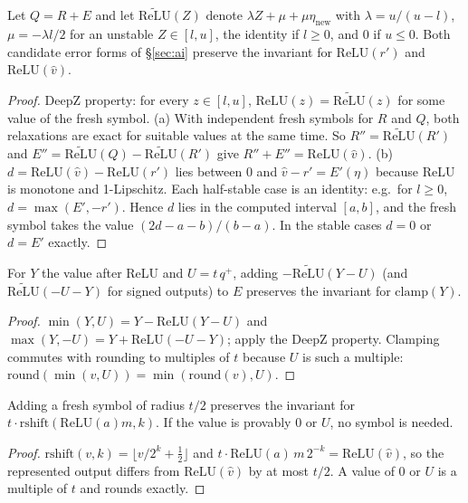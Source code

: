 \begin{lemma}[ReLU]
Let $Q=R+E$ and let $\widetilde{\mathrm{ReLU}}(Z)$ denote $\lambda Z+\mu+\mu\eta_{\mathrm{new}}$ with $\lambda=u/(u-l)$, $\mu=-\lambda l/2$ for an unstable $Z\in[l,u]$, the identity if $l\ge0$, and $0$ if $u\le0$. Both candidate error forms of \S\ref{sec:ai} preserve the invariant for $\mathrm{ReLU}(r')$ and $\mathrm{ReLU}(\hat v)$.
\end{lemma}
\begin{proof}
DeepZ property: for every $z\in[l,u]$, $\mathrm{ReLU}(z)=\widetilde{\mathrm{ReLU}}(z)$ for some value of the fresh symbol. (a) With independent fresh symbols for $R$ and $Q$, both relaxations are exact for suitable values at the same time. So $R''=\widetilde{\mathrm{ReLU}}(R')$ and $E''=\widetilde{\mathrm{ReLU}}(Q)-\widetilde{\mathrm{ReLU}}(R')$ give $R''+E''=\mathrm{ReLU}(\hat v)$. (b) $d=\mathrm{ReLU}(\hat v)-\mathrm{ReLU}(r')$ lies between $0$ and $\hat v-r'=E'(\eta)$ because ReLU is monotone and 1-Lipschitz. Each half-stable case is an identity: e.g.\ for $l\ge0$, $d=\max(E',-r')$. Hence $d$ lies in the computed interval $[a,b]$, and the fresh symbol takes the value $(2d-a-b)/(b-a)$. In the stable cases $d=0$ or $d=E'$ exactly.
\end{proof}

\begin{lemma}[Clamp]
For $Y$ the value after ReLU and $U=t\,q^+$, adding $-\widetilde{\mathrm{ReLU}}(Y-U)$ (and $\widetilde{\mathrm{ReLU}}(-U-Y)$ for signed outputs) to $E$ preserves the invariant for $\mathrm{clamp}(Y)$.
\end{lemma}
\begin{proof}
$\min(Y,U)=Y-\mathrm{ReLU}(Y-U)$ and $\max(Y,-U)=Y+\mathrm{ReLU}(-U-Y)$; apply the DeepZ property. Clamping commutes with rounding to multiples of $t$ because $U$ is such a multiple: $\mathrm{round}(\min(v,U))=\min(\mathrm{round}(v),U)$.
\end{proof}

\begin{lemma}[Rounding]
Adding a fresh symbol of radius $t/2$ preserves the invariant for $t\cdot\mathrm{rshift}(\mathrm{ReLU}(a)m,k)$. If the value is provably $0$ or $U$, no symbol is needed.
\end{lemma}
\begin{proof}
$\mathrm{rshift}(v,k)=\lfloor v/2^k+\tfrac12\rfloor$ and $t\cdot\mathrm{ReLU}(a)\,m\,2^{-k}=\mathrm{ReLU}(\hat v)$, so the represented output differs from $\mathrm{ReLU}(\hat v)$ by at most $t/2$. A value of $0$ or $U$ is a multiple of $t$ and rounds exactly.
\end{proof}

